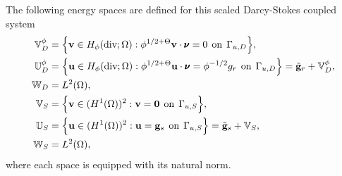 The following energy spaces are defined for this scaled Darcy-Stokes coupled system 
\begin{equation}\label{eq:spaces}
		  \begin{aligned}
					 \mathbb{V}^\phi_D &= \Big\{\mathbf{v}\in H_{\phi}(\text{div};\Omega): \phi^{1/2+\Theta} \mathbf{v}\cdot \pmb{\nu} = 0 \hspace{0.15cm} \text{on}\hspace{0.15cm} \Gamma_{u,D}  \Big\},\\
					 \mathbb{U}^\phi_D &= \Big\{\mathbf{u}\in H_{\phi}(\text{div};\Omega): \phi^{1/2+\Theta} \mathbf{u}\cdot \pmb{\nu} = \phi^{-1/2}g_r \hspace{0.15cm} \text{on}\hspace{0.15cm} \Gamma_{u,D}  \Big\} = \tilde{\mathbf{g}}_r + \mathbb{V}^\phi_D,\\
					 \mathbb{W}_D      &= L^2(\Omega),\\
					 \mathbb{V}_S &= \Big\{\mathbf{v}\in (H^1(\Omega))^2 : \mathbf{v} = \mathbf{0} \hspace{0.15cm} \text{on}\hspace{0.15cm}  \Gamma_{u,S} \Big\},\\
					 \mathbb{U}_S &= \Big\{\mathbf{u}\in (H^1(\Omega))^2 : \mathbf{u} = \mathbf{g}_s \hspace{0.15cm} \text{on}\hspace{0.15cm}  \Gamma_{u,S} \Big\} 
					 = \tilde{\mathbf{g}}_s + \mathbb{V}_S,\\
		  \mathbb{W}_S &= L^2(\Omega),
		  \end{aligned}
\end{equation}
where each space is equipped with its natural norm.

